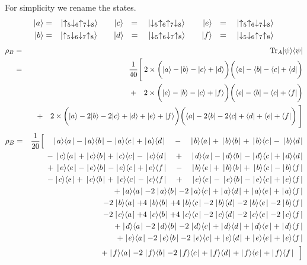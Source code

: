 For simplicity we rename the states.
\begin{eqnarray*}
	\lvert {a} \rangle &=& \lvert {\uparrow_5\downarrow_6\uparrow_7\downarrow_8} \rangle  \qquad  \lvert {c} \rangle \: \: \: = \quad \lvert {\downarrow_5\uparrow_6\uparrow_7\downarrow_8} \rangle \qquad  \,\lvert {e} \rangle \: \: \: = \quad\lvert {\uparrow_5\uparrow_6\downarrow_7\downarrow_8} \rangle \\
	\lvert {b} \rangle &=& \lvert {\uparrow_5\downarrow_6\downarrow_7\uparrow_8} \rangle  \qquad  \lvert {d} \rangle \: \: \: = \quad \lvert {\downarrow_5\uparrow_6\downarrow_7\uparrow_8} \rangle \qquad  \lvert {f} \rangle \: \: \: = \quad \lvert {\downarrow_5\downarrow_6\uparrow_7\uparrow_8} \rangle 
\end{eqnarray*}
\begin{eqnarray*}
	\rho_B &=& {\rm Tr}_A \lvert {\psi} \rangle\langle {\psi} \rvert \\
		&=& \frac{1}{40}\Bigg[ \:2\times \bigg( \lvert {a} \rangle - \lvert {b} \rangle -\lvert {c} \rangle + \lvert {d} \rangle \bigg)\bigg(\langle {a} \rvert-\langle {b} \rvert-\langle {c} \rvert+\langle {d} \rvert\bigg) \\
		&&\quad + \quad
			2\times\bigg( \lvert {e} \rangle - \lvert {b} \rangle -\lvert {c} \rangle + \lvert {f} \rangle \bigg)\bigg(\langle {e} \rvert-\langle {b} \rvert-\langle {c} \rvert+\langle {f} \rvert\bigg) \\
		&&  \quad + \quad 2\times \bigg(\lvert {a} \rangle-2\lvert {b} \rangle-2\lvert {c} \rangle+\lvert {d} \rangle+\lvert {e} \rangle+\lvert {f} \rangle\bigg)
			\bigg(\langle {a} \rvert-2\langle {b} \rvert-2\langle {c} \rvert+\langle {d} \rvert+\langle {e} \rvert+\langle {f} \rvert\bigg)\:\Bigg]
\end{eqnarray*}
\begin{eqnarray*}
	\rho_B&=& \frac{1}{20}\Big[\quad\kb{a}{a}-\kb{a}{b}-\kb{a}{c}+\kb{a}{d}\quad-\quad\kb{b}{a}+\,\kb{b}{b}+\,\kb{b}{c}-\,\kb{b}{d} \\
		&&    \quad\:\:\,-\,\kb{c}{a}+\kb{c}{b}+\kb{c}{c}-\,\kb{c}{d} \quad+ \quad \kb{d}{a}-\kb{d}{b}-\kb{d}{c}+\kb{d}{d} \\
		&&    \quad\:\:\,+\,\kb{e}{e}-\kb{e}{b}-\kb{e}{c}+\kb{e}{f} \quad-\quad \kb{b}{e}+\,\kb{b}{b}+\,\kb{b}{c}-\kb{b}{f} \\
		&&    \quad\:\:\,-\kb{c}{e}+\,\kb{c}{b}+\,\kb{c}{c}-\kb{c}{f}\quad+\quad\kb{e}{e}-\,\kb{e}{b}-\kb{e}{c}+\kb{e}{f} \\
		&&    \quad\:\:\,+\kb{a}{a}-2\kb{a}{b}-2\kb{a}{c}+\kb{a}{d}+\kb{a}{e}+\kb{a}{f}   
		\\ &&  \quad\:\:\,- 2\kb{b}{a}+4\kb{b}{b}+4\kb{b}{c}-2\kb{b}{d}-2\kb{b}{e}-2\kb{b}{f} \\
		&&    \quad\:\:\,-2\kb{c}{a}+4\kb{c}{b}+4\kb{c}{c}-2\kb{c}{d}-2\kb{c}{e}-2\kb{c}{f}\\
		&& \quad\:\:\,+\kb{d}{a}-2\kb{d}{b}-2\kb{d}{c}+\kb{d}{d}+\kb{d}{e}+\kb{d}{f} \\
		&&  	\:\quad\:\:\, +\kb{e}{a}-2\kb{e}{b}-2\kb{e}{c}+\kb{e}{d}+\kb{e}{e}+\kb{e}{f}
		\\ && 	\:\quad\:\:\, +\kb{f}{a}-2\kb{f}{b}-2\kb{f}{c}+\kb{f}{d}+\kb{f}{e}+\kb{f}{f} \:\:\Big]
\end{eqnarray*}
